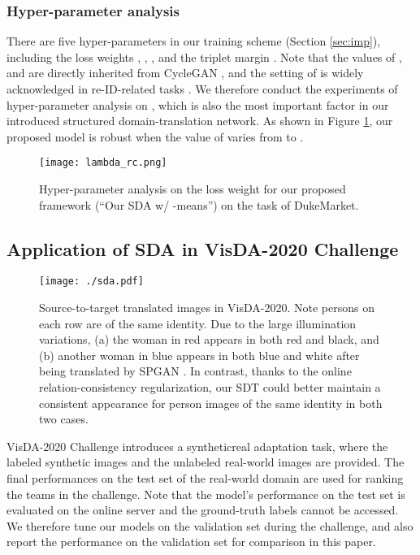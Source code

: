 \documentclass[journal]{IEEEtran}
\begin{document}
\subsubsection{\textbf{ {Hyper-parameter analysis}}}
 {
There are five hyper-parameters in our training scheme (Section \ref{sec:imp}), including the loss weights , , ,  and the triplet margin . Note that the values of ,  and  are directly inherited from CycleGAN \cite{zhu2017unpaired}, and the setting of  is widely acknowledged in re-ID-related tasks \cite{luo2019bag,ge2020mutual}. We therefore conduct the experiments of hyper-parameter analysis on , which is also the most important factor in our introduced structured domain-translation network. As shown in Figure \ref{fig:rc}, our proposed model is robust when the value of  varies from  to .}

\begin{figure}
    \centering
    \texttt{[image: lambda\_rc.png]}
    \caption{Hyper-parameter analysis on the loss weight  for our proposed framework (``Our SDA w/ -means'') on the task of DukeMarket.}
    \label{fig:rc}
\end{figure}

\subsection{Application of SDA in VisDA-2020 Challenge}


\begin{figure}[t]
\centering
\texttt{[image: ./sda.pdf]}
\caption{Source-to-target translated images in VisDA-2020.   {Note persons on each row are of the same identity.}
Due to the large illumination variations,
(a) the woman in red appears in both red and black, and (b) another woman in blue appears in both blue and white after being translated by SPGAN \cite{deng2018image}.
In contrast, thanks to the online relation-consistency regularization, our SDT could better maintain a consistent appearance for person images of the same identity in both two cases.
}
\label{fig:sda}
\end{figure}

VisDA-2020 Challenge introduces a syntheticreal adaptation task, where the labeled synthetic images and the unlabeled real-world images are provided.
 {The final performances on the test set of the real-world domain are used for ranking the teams in the challenge. Note that the model's performance on the test set is evaluated on the online server and the ground-truth labels cannot be accessed.  We therefore tune our models on the validation set during the challenge, and also report the performance on the validation set for comparison in this paper.}
\end{document}
